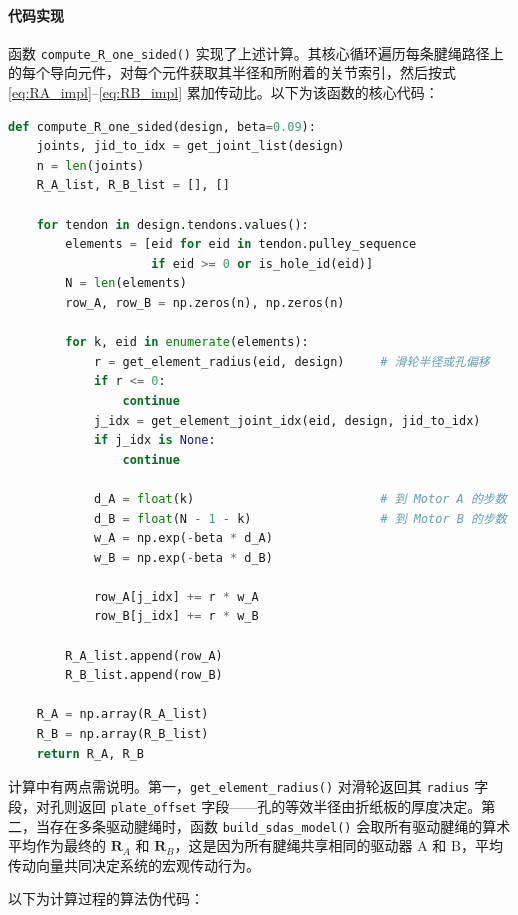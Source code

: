 \documentclass[12pt,a4paper]{report}
\begin{document}
\paragraph{代码实现}

函数 \lstinline{compute_R_one_sided()} 实现了上述计算。其核心循环遍历每条腱绳路径上的每个导向元件，对每个元件获取其半径和所附着的关节索引，然后按式\,\eqref{eq:RA_impl}--\eqref{eq:RB_impl} 累加传动比。以下为该函数的核心代码：

\begin{lstlisting}[language=Python, caption=\lstinline{compute_R_one_sided()} 的核心循环]
def compute_R_one_sided(design, beta=0.09):
    joints, jid_to_idx = get_joint_list(design)
    n = len(joints)
    R_A_list, R_B_list = [], []

    for tendon in design.tendons.values():
        elements = [eid for eid in tendon.pulley_sequence
                    if eid >= 0 or is_hole_id(eid)]
        N = len(elements)
        row_A, row_B = np.zeros(n), np.zeros(n)

        for k, eid in enumerate(elements):
            r = get_element_radius(eid, design)     # 滑轮半径或孔偏移
            if r <= 0:
                continue
            j_idx = get_element_joint_idx(eid, design, jid_to_idx)
            if j_idx is None:
                continue

            d_A = float(k)                          # 到 Motor A 的步数
            d_B = float(N - 1 - k)                  # 到 Motor B 的步数
            w_A = np.exp(-beta * d_A)
            w_B = np.exp(-beta * d_B)

            row_A[j_idx] += r * w_A
            row_B[j_idx] += r * w_B

        R_A_list.append(row_A)
        R_B_list.append(row_B)

    R_A = np.array(R_A_list)
    R_B = np.array(R_B_list)
    return R_A, R_B
\end{lstlisting}

计算中有两点需说明。第一，\lstinline{get_element_radius()} 对滑轮返回其 \lstinline{radius} 字段，对孔则返回 \lstinline{plate_offset} 字段——孔的等效半径由折纸板的厚度决定。第二，当存在多条驱动腱绳时，函数 \lstinline{build_sdas_model()} 会取所有驱动腱绳的算术平均作为最终的 $\mathbf{R}_A$ 和 $\mathbf{R}_B$，这是因为所有腱绳共享相同的驱动器 A 和 B，平均传动向量共同决定系统的宏观传动行为。

以下为计算过程的算法伪代码：
\end{document}

